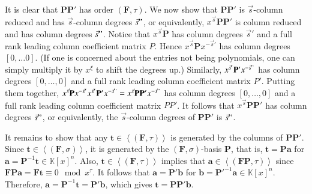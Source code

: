 \begin{pf}
It is clear that $\mathbf{P}\mathbf{P}'$ has order $(\mathbf{F},\tau)$.
We now show that $\mathbf{P}\mathbf{P}'$ is $\vec{s}$-column reduced
and has $\vec{s}$-column degrees $\vec{s}"$, or equivalently, $x^{\vec{s}}\mathbf{P}\mathbf{P}'$
is column reduced and has column degrees $\vec{s}"$. Notice that
$x^{\vec{s}}\mathbf{P}$ has column degrees $\vec{s}'$ and a full
rank leading column coefficient matrix $P$. Hence $x^{\vec{s}}\mathbf{P}x^{-\vec{s}'}$
has column degrees $\left[0,\dots0\right]$. (If one is concerned
about the entries not being polynomials, one can simply multiply it
by $x^{\xi}$ to shift the degrees up.) Similarly, $x^{\vec{s}'}\mathbf{P}'x^{-\vec{s}"}$
has column degrees $[0,\dots,0]$ and a full rank leading column coefficient
matrix $P'$. Putting them together, $x^{\vec{s}}\mathbf{P}x^{-\vec{s}'}x^{\vec{s}'}\mathbf{P}'x^{-\vec{s}"}=x^{\vec{s}}\mathbf{P}\mathbf{P}'x^{-\vec{s}"}$
has column degrees $[0,\dots,0]$ and a full rank leading column coefficient
matrix $PP'$. It follows that $x^{\vec{s}}\mathbf{P}\mathbf{P}'$
has column degrees $\vec{s}"$, or equivalently, the $\vec{s}$-column
degrees of $\mathbf{PP}'$ is $\vec{s}"$.

It remains to show that any $\mathbf{t}\in\left\langle \left(\mathbf{F},\tau\right)\right\rangle $
is generated by the columns of $\mathbf{PP}'$. Since $\mathbf{t}\in\left\langle \left(\mathbf{F},\sigma\right)\right\rangle $,
it is generated by the $\left(\mathbf{F},\sigma\right)$-basis $\mathbf{P}$,
that is, $\mathbf{t}=\mathbf{P}\mathbf{a}$ for $\mathbf{a}=\mathbf{P}^{-1}\mathbf{t}\in\mathbb{K}\left[x\right]^{n}$.
Also, $\mathbf{t}\in\left\langle \left(\mathbf{F},\tau\right)\right\rangle $
implies that $\mathbf{a}\in\left\langle \left(\mathbf{FP},\tau\right)\right\rangle $
since $\mathbf{F}\mathbf{P}\mathbf{a}=\mathbf{F}\mathbf{t}\equiv0\mod x^{\tau}$.
It follows that $\mathbf{a}=\mathbf{P}'\mathbf{b}$ for $\mathbf{b}=\mathbf{P}'^{-1}\mathbf{a}\in\mathbb{K}\left[x\right]^{n}$.
Therefore, $\mathbf{a}=\mathbf{P}^{-1}\mathbf{t}=\mathbf{P}'\mathbf{b}$,
which gives $\mathbf{t}=\mathbf{P}\mathbf{P}'\mathbf{b}$.
\end{pf}

